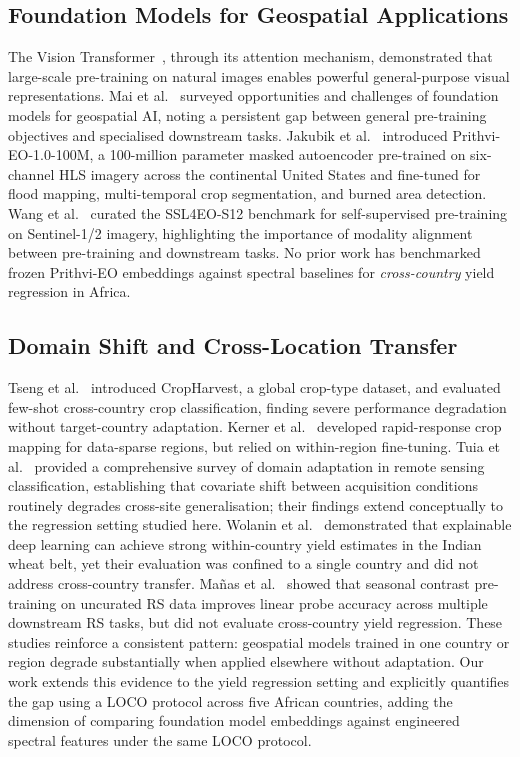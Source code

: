 \documentclass[journal]{IEEEtran}
\begin{document}
\subsection{Foundation Models for Geospatial Applications}

The Vision Transformer~\cite{dosovitskiy2021vit}, through its attention mechanism,
demonstrated that large-scale pre-training on natural images enables powerful
general-purpose visual representations.
Mai et al.~\cite{mai2023foundation} surveyed opportunities and challenges of
foundation models for geospatial AI, noting a persistent gap between
general pre-training objectives and specialised downstream tasks.
Jakubik et al.~\cite{jakubik2023prithvi} introduced Prithvi-EO-1.0-100M,
a 100-million parameter masked autoencoder pre-trained on six-channel HLS imagery
across the continental United States and fine-tuned for flood mapping,
multi-temporal crop segmentation, and burned area detection.
Wang et al.~\cite{wang2022empirical} curated the SSL4EO-S12 benchmark for
self-supervised pre-training on Sentinel-1/2 imagery, highlighting the
importance of modality alignment between pre-training and downstream tasks.
No prior work has benchmarked frozen Prithvi-EO embeddings against
spectral baselines for \emph{cross-country} yield regression in Africa.

\subsection{Domain Shift and Cross-Location Transfer}

Tseng et al.~\cite{tseng2021crop} introduced CropHarvest, a global crop-type
dataset, and evaluated few-shot cross-country crop classification,
finding severe performance degradation without target-country adaptation.
Kerner et al.~\cite{kerner2020rapid} developed rapid-response crop mapping
for data-sparse regions, but relied on within-region fine-tuning.
Tuia et al.~\cite{tuia2016domain} provided a comprehensive survey of domain
adaptation in remote sensing classification, establishing that covariate shift
between acquisition conditions routinely degrades cross-site generalisation;
their findings extend conceptually to the regression setting studied here.
Wolanin et al.~\cite{wolanin2020estimating} demonstrated that explainable
deep learning can achieve strong within-country yield estimates in the Indian
wheat belt, yet their evaluation was confined to a single country and did
not address cross-country transfer.
Ma\~{n}as et al.~\cite{manas2021seasonal} showed that seasonal contrast
pre-training on uncurated RS data improves linear probe accuracy across
multiple downstream RS tasks, but did not evaluate cross-country yield regression.
These studies reinforce a consistent pattern: geospatial models trained in
one country or region degrade substantially when applied elsewhere without
adaptation.
Our work extends this evidence to the yield regression setting and explicitly
quantifies the gap using a LOCO protocol across five African countries,
adding the dimension of comparing foundation model embeddings against
engineered spectral features under the same LOCO protocol.
\end{document}
